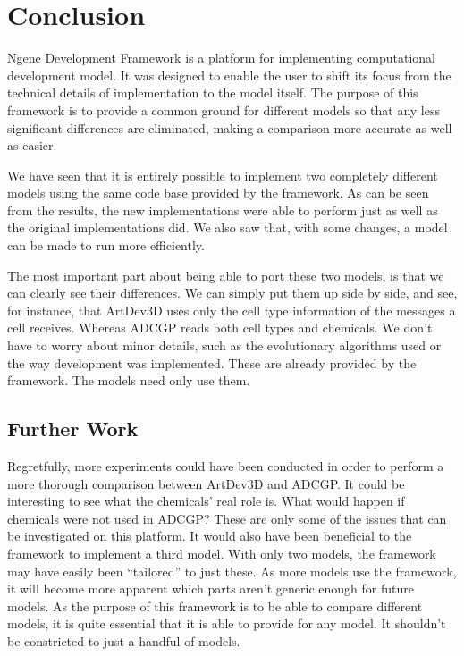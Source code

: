 \section{Conclusion}
Ngene Development Framework is a platform for implementing computational development model. It was designed to enable the user to shift its focus from the technical details of implementation to the model itself. The purpose of this framework is to provide a common ground for different models so that any less significant differences are eliminated, making a comparison more accurate as well as easier.

We have seen that it is entirely possible to implement two completely different models using the same code base provided by the framework. As can be seen from the results, the new implementations were able to perform just as well as the original implementations did. We also saw that, with some changes, a model can be made to run more efficiently.

The most important part about being able to port these two models, is that we can clearly see their differences. We can simply put them up side by side, and see, for instance, that ArtDev3D uses only the cell type information of the messages a cell receives. Whereas ADCGP reads both cell types and chemicals. We don't have to worry about minor details, such as the evolutionary algorithms used or the way development was implemented. These are already provided by the framework. The models need only use them.


\subsection{Further Work}

Regretfully, more experiments could have been conducted in order to perform a more thorough comparison between ArtDev3D and ADCGP. It could be interesting to see what the chemicals' real role is. What would happen if chemicals were not used in ADCGP? These are only some of the issues that can be investigated on this platform. It would also have been beneficial to the framework to implement a third model. With only two models, the framework may have easily been ``tailored'' to just these. As more models use the framework, it will become more apparent which parts aren't generic enough for future models. As the purpose of this framework is to be able to compare different models, it is quite essential that it is able to provide for any model. It shouldn't be constricted to just a handful of models.


